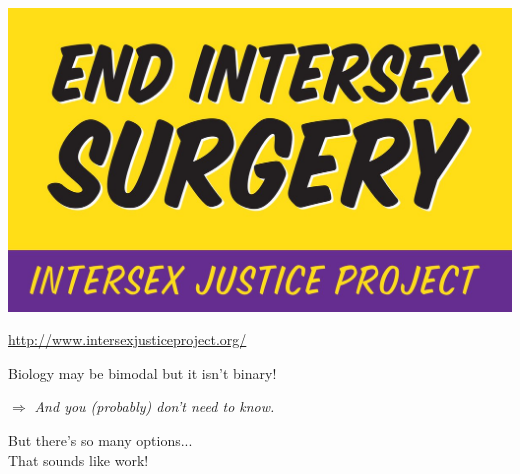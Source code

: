 \documentclass[aspectratio=169,x11names]{beamer}
\begin{document}
\begin{frame}
\begin{center}
\includegraphics[height=0.6\textheight,keepaspectratio]{images/end_intersex_surgeries.jpg} 
\bigskip

\large
\url{http://www.intersexjusticeproject.org/}
\end{center}
\end{frame}

\begin{frame}
\begin{center}
\huge
Biology may be bimodal but it isn't binary!\medskip

\Large
$\Rightarrow$ \emph{And you (probably) don't need to know.}
\end{center}
\end{frame}

\begin{frame}
\begin{center}
\huge
But there's so many options...\\
That sounds like work!
\end{center}
\end{frame}
\end{document}
